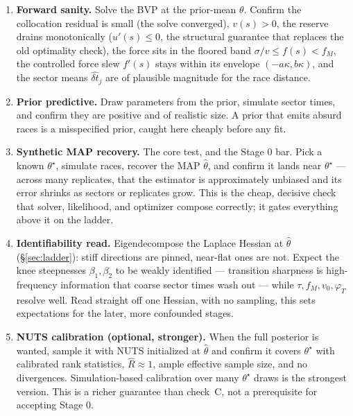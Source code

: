 \documentclass[11pt]{article}
\newcommand{\dt}{\widehat{\delta t}}
\begin{document}
\begin{enumerate}
\item[\textbf{A}] \textbf{Forward sanity.} Solve the BVP at the prior-mean $\theta$. Confirm the collocation residual is small (the solve converged), $v(s) > 0$, the reserve drains monotonically ($u'(s) \leq 0$, the structural guarantee that replaces the old optimality check), the force sits in the floored band $\sigma/v \leq f(s) < f_M$, the controlled force slew $f'(s)$ stays within its envelope $(-a\kappa, b\kappa)$, and the sector means $\dt_j$ are of plausible magnitude for the race distance.

\item[\textbf{B}] \textbf{Prior predictive.} Draw parameters from the prior, simulate sector times, and confirm they are positive and of realistic size. A prior that emits absurd races is a misspecified prior, caught here cheaply before any fit.

\item[\textbf{C}] \textbf{Synthetic MAP recovery.} The core test, and the Stage 0 bar. Pick a known $\theta^\star$, simulate races, recover the MAP $\hat\theta$, and confirm it lands near $\theta^\star$ --- across many replicates, that the estimator is approximately unbiased and its error shrinks as sectors or replicates grow. This is the cheap, decisive check that solver, likelihood, and optimizer compose correctly; it gates everything above it on the ladder.

\item[\textbf{D}] \textbf{Identifiability read.} Eigendecompose the Laplace Hessian at $\hat\theta$ (\S\ref{sec:ladder}): stiff directions are pinned, near-flat ones are not. Expect the knee steepnesses $\beta_1, \beta_2$ to be weakly identified --- transition sharpness is high-frequency information that coarse sector times wash out --- while $\tau, f_M, v_0, \varphi_T$ resolve well. Read straight off one Hessian, with no sampling, this sets expectations for the later, more confounded stages.

\item[\textbf{E}] \textbf{NUTS calibration (optional, stronger).} When the full posterior is wanted, sample it with NUTS initialized at $\hat\theta$ and confirm it covers $\theta^\star$ with calibrated rank statistics, $\hat R \approx 1$, ample effective sample size, and no divergences. Simulation-based calibration over many $\theta^\star$ draws is the strongest version. This is a richer guarantee than check~C, not a prerequisite for accepting Stage 0.
\end{enumerate}
\end{document}
